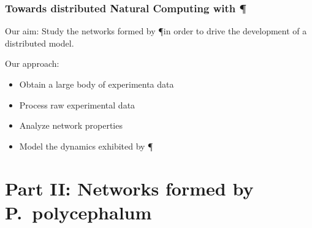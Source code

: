 \documentclass[	hyperref={pdfpagelabels=false}, xcolor=dvipsnames,
		11pt]{beamer}
\begin{document}
\begin{frame}
    \frametitle{Towards distributed Natural Computing with \P} 

    \begin{block}{Our aim:}
    	Study the networks formed by \P in order to drive the development of a distributed model.
    \end{block}

	\begin{alertblock}{Our approach:}
		\begin{itemize}
			\item Obtain a large body of experimenta data
			\item Process raw experimental data
			\item Analyze network properties
			\item Model the dynamics exhibited by \P
		\end{itemize}
	\end{alertblock}
\end{frame}

\section{Part II: Networks formed by P.~polycephalum} 
\end{document}
